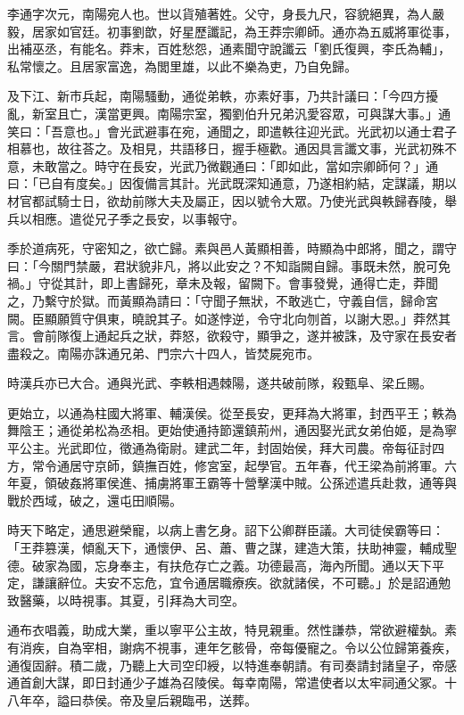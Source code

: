 
\begin{pinyinscope}
李通字次元，南陽宛人也。世以貨殖著姓。父守，身長九尺，容貌絕異，為人嚴毅，居家如官廷。初事劉歆，好星歷讖記，為王莽宗卿師。通亦為五威將軍從事，出補巫丞，有能名。莽末，百姓愁怨，通素聞守說讖云「劉氏復興，李氏為輔」，私常懷之。且居家富逸，為閭里雄，以此不樂為吏，乃自免歸。

及下江、新巿兵起，南陽騷動，通從弟軼，亦素好事，乃共計議曰：「今四方擾亂，新室且亡，漢當更興。南陽宗室，獨劉伯升兄弟汎愛容眾，可與謀大事。」通笑曰：「吾意也。」會光武避事在宛，通聞之，即遣軼往迎光武。光武初以通士君子相慕也，故往荅之。及相見，共語移日，握手極歡。通因具言讖文事，光武初殊不意，未敢當之。時守在長安，光武乃微觀通曰：「即如此，當如宗卿師何？」通曰：「已自有度矣。」因復備言其計。光武既深知通意，乃遂相約結，定謀議，期以材官都試騎士日，欲劫前隊大夫及屬正，因以號令大眾。乃使光武與軼歸舂陵，舉兵以相應。遣從兄子季之長安，以事報守。

季於道病死，守密知之，欲亡歸。素與邑人黃顯相善，時顯為中郎將，聞之，謂守曰：「今關門禁嚴，君狀貌非凡，將以此安之？不知詣闕自歸。事既未然，脫可免禍。」守從其計，即上書歸死，章未及報，留闕下。會事發覺，通得亡走，莽聞之，乃繫守於獄。而黃顯為請曰：「守聞子無狀，不敢逃亡，守義自信，歸命宮闕。臣顯願質守俱東，曉說其子。如遂悖逆，令守北向刎首，以謝大恩。」莽然其言。會前隊復上通起兵之狀，莽怒，欲殺守，顯爭之，遂并被誅，及守家在長安者盡殺之。南陽亦誅通兄弟、門宗六十四人，皆焚屍宛巿。

時漢兵亦已大合。通與光武、李軼相遇棘陽，遂共破前隊，殺甄阜、梁丘賜。

更始立，以通為柱國大將軍、輔漢侯。從至長安，更拜為大將軍，封西平王；軼為舞陰王；通從弟松為丞相。更始使通持節還鎮荊州，通因娶光武女弟伯姬，是為寧平公主。光武即位，徵通為衛尉。建武二年，封固始侯，拜大司農。帝每征討四方，常令通居守京師，鎮撫百姓，修宮室，起學官。五年春，代王梁為前將軍。六年夏，領破姦將軍侯進、捕虜將軍王霸等十營擊漢中賊。公孫述遣兵赴救，通等與戰於西域，破之，還屯田順陽。

時天下略定，通思避榮寵，以病上書乞身。詔下公卿群臣議。大司徒侯霸等曰：「王莽篡漢，傾亂天下，通懷伊、呂、蕭、曹之謀，建造大策，扶助神靈，輔成聖德。破家為國，忘身奉主，有扶危存亡之義。功德最高，海內所聞。通以天下平定，謙讓辭位。夫安不忘危，宜令通居職療疾。欲就諸侯，不可聽。」於是詔通勉致醫藥，以時視事。其夏，引拜為大司空。

通布衣唱義，助成大業，重以寧平公主故，特見親重。然性謙恭，常欲避權埶。素有消疾，自為宰相，謝病不視事，連年乞骸骨，帝每優寵之。令以公位歸第養疾，通復固辭。積二歲，乃聽上大司空印綬，以特進奉朝請。有司奏請封諸皇子，帝感通首創大謀，即日封通少子雄為召陵侯。每幸南陽，常遣使者以太牢祠通父冢。十八年卒，謚曰恭侯。帝及皇后親臨弔，送葬。


\end{pinyinscope}
